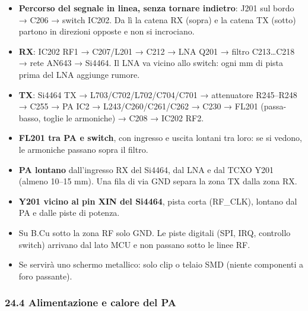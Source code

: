 \begin{itemize}
\item \textbf{Percorso del segnale in linea, senza tornare indietro}: J201 sul bordo → C206 → switch IC202. Da lì la catena RX (sopra) e la catena TX (sotto) partono in direzioni opposte e non si incrociano.
\item \textbf{RX}: IC202 RF1 → C207/\allowbreak{}L201 → C212 → LNA Q201 → filtro C213…C218 → rete AN643 → Si4464. Il LNA va vicino allo switch: ogni mm di pista prima del LNA aggiunge rumore.
\item \textbf{TX}: Si4464 TX → L703/\allowbreak{}C702/\allowbreak{}L702/\allowbreak{}C704/\allowbreak{}C701 → attenuatore R245–R248 → C255 → PA IC2 → L243/\allowbreak{}C260/\allowbreak{}C261/\allowbreak{}C262 → C230 → FL201 (passa-basso, toglie le armoniche) → C208 → IC202 RF2.
\item \textbf{FL201 tra PA e switch}, con ingresso e uscita lontani tra loro: se si vedono, le armoniche passano sopra il filtro.
\item \textbf{PA lontano} dall'ingresso RX del Si4464, dal LNA e dal TCXO Y201 (almeno 10–15 mm). Una fila di via GND separa la zona TX dalla zona RX.
\item \textbf{Y201 vicino al pin XIN del Si4464}, pista corta (RF\_\allowbreak{}CLK), lontano dal PA e dalle piste di potenza.
\item Su B.Cu sotto la zona RF solo GND. Le piste digitali (SPI, IRQ, controllo switch) arrivano dal lato MCU e non passano sotto le linee RF.
\item Se servirà uno schermo metallico: solo clip o telaio SMD (niente componenti a foro passante).
\end{itemize}

\subsubsection[24.4 Alimentazione e calore del PA]{24.4 Alimentazione e calore del PA}

